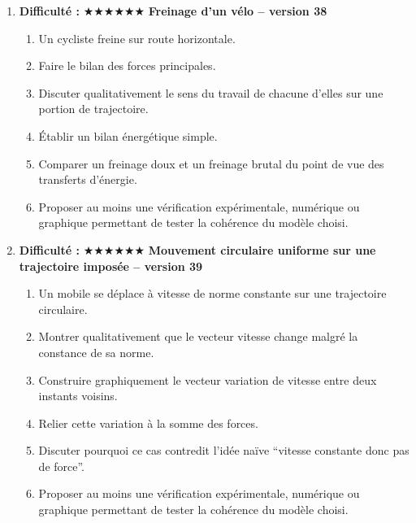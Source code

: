 \documentclass[11pt,a4paper]{article}
\newcommand{\etoiles}[1]{\textbf{Difficulté : }#1}
\begin{document}
\begin{enumerate}[label=\textbf{Problème long \arabic*.},leftmargin=*]
\begin{enumerate}[label=\alph*)]
\item Décrire les formes d'énergie au cours du mouvement.
\item Identifier les positions où l'énergie potentielle est maximale et celles où l'énergie cinétique est maximale.
\item Discuter l'influence d'un frottement de l'air faible sur l'amplitude au cours du temps.
\item Relier ce problème aux échanges d'énergie dans d'autres oscillateurs.
\item Proposer au moins une vérification expérimentale, numérique ou graphique permettant de tester la cohérence du modèle choisi.
\end{enumerate}
\item \etoiles{★★★★★★}
\textbf{Freinage d'un vélo -- version 38}
\begin{enumerate}[label=\alph*)]
\item Un cycliste freine sur route horizontale.
\item Faire le bilan des forces principales.
\item Discuter qualitativement le sens du travail de chacune d'elles sur une portion de trajectoire.
\item Établir un bilan énergétique simple.
\item Comparer un freinage doux et un freinage brutal du point de vue des transferts d'énergie.
\item Proposer au moins une vérification expérimentale, numérique ou graphique permettant de tester la cohérence du modèle choisi.
\end{enumerate}
\item \etoiles{★★★★★★}
\textbf{Mouvement circulaire uniforme sur une trajectoire imposée -- version 39}
\begin{enumerate}[label=\alph*)]
\item Un mobile se déplace à vitesse de norme constante sur une trajectoire circulaire.
\item Montrer qualitativement que le vecteur vitesse change malgré la constance de sa norme.
\item Construire graphiquement le vecteur variation de vitesse entre deux instants voisins.
\item Relier cette variation à la somme des forces.
\item Discuter pourquoi ce cas contredit l'idée naïve ``vitesse constante donc pas de force''.
\item Proposer au moins une vérification expérimentale, numérique ou graphique permettant de tester la cohérence du modèle choisi.

\end{enumerate}
\end{enumerate}
\end{document}
